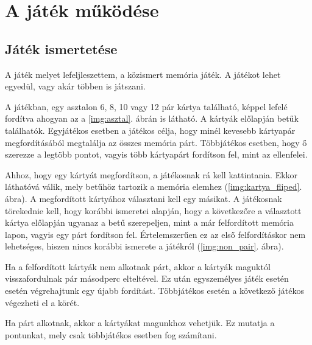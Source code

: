 \chapter{A játék működése}

\thispagestyle{fancy}
\pagestyle{fancy}
\section{Játék ismertetése}
A játék melyet lefeljleszettem, a közismert memória játék. A játékot lehet egyedül, vagy akár többen is játszani.

A játékban, egy asztalon 6, 8, 10 vagy 12 pár kártya található, képpel lefelé fordítva ahogyan az a \ref{img:asztal}. ábrán is látható.
A kártyák előlapján betűk találhatók. Egyjátékos esetben a játékos célja, hogy minél kevesebb kártyapár megfordításából megtalálja az összes memória párt. Többjátékos esetben, hogy ő szerezze a legtöbb pontot, vagyis több kártyapárt fordítson fel, mint az ellenfelei.

Ahhoz, hogy egy kártyát megfordítson, a játékosnak rá kell kattintania. Ekkor láthatóvá válik, mely betűhöz tartozik a memória elemhez (\ref{img:kartya_fliped}. ábra). 
A megfordított kártyához választani kell egy másikat. A játékosnak törekednie kell, hogy korábbi ismeretei alapján, hogy a következőre a választott kártya előlapján ugyanaz a betű szerepeljen, mint a már felfordított memória lapon, vagyis egy párt fordítson fel. 
Értelemszerűen ez az első felfordításkor nem lehetséges, hiszen nincs korábbi ismerete a játékról (\ref{img:non_pair}. ábra).

Ha a felfordított kártyák nem alkotnak párt, akkor a kártyák maguktól visszafordulnak pár másodperc elteltével. Ez után egyszemélyes játék esetén esetén végrehajtunk egy újabb fordítást. Többjátékos esetén a következő játékos végezheti el a körét. 

Ha párt alkotnak, akkor a kártyákat magunkhoz vehetjük. Ez mutatja a pontunkat, mely csak többjátékos esetben fog számítani.




